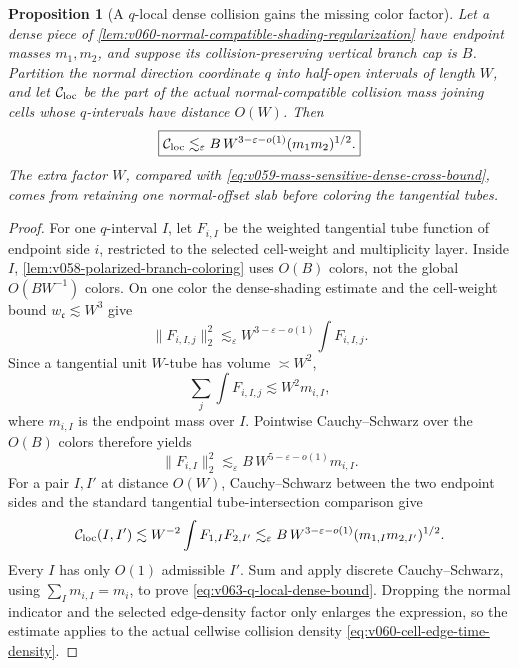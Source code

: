 \documentclass[10pt]{article}
\newtheorem{proposition}[theorem]{Proposition}
\begin{document}
\begin{proposition}[A \(q\)-local dense collision gains the missing color factor]
\label{prop:v063-q-local-dense-bound}
Let a dense piece of
\cref{lem:v060-normal-compatible-shading-regularization} have endpoint masses \(m_1,m_2\), and
suppose its collision-preserving vertical branch cap is \(B\).  Partition the normal direction
coordinate \(q\) into half-open intervals of length \(W\), and let
\(\mathcal C_{\rm loc}\) be the part of the actual normal-compatible collision mass joining cells
whose \(q\)-intervals have distance \(O(W)\).  Then
\begin{equation}
\label{eq:v063-q-local-dense-bound}
\boxed{
\mathcal C_{\rm loc}
\lesssim_\varepsilon
B\,W^{3-\varepsilon-o(1)}
(m_1m_2)^{1/2}.
}
\end{equation}
The extra factor \(W\), compared with
\eqref{eq:v059-mass-sensitive-dense-cross-bound}, comes from retaining one normal-offset slab before
coloring the tangential tubes.
\end{proposition}

\begin{proof}
For one \(q\)-interval \(I\), let \(F_{i,I}\) be the weighted tangential tube function of endpoint
side \(i\), restricted to the selected cell-weight and multiplicity layer.  Inside \(I\),
\cref{lem:v058-polarized-branch-coloring} uses \(O(B)\) colors, not the global
\(O(BW^{-1})\) colors.  On one color the dense-shading estimate and the cell-weight bound
\(w_{\mathfrak c}\lesssim W^3\) give
\[
\|F_{i,I,j}\|_2^2
\lesssim_\varepsilon
W^{3-\varepsilon-o(1)}
\int F_{i,I,j}.
\]
Since a tangential unit \(W\)-tube has volume \(\asymp W^2\),
\[
\sum_j\int F_{i,I,j}
\lesssim
W^2m_{i,I},
\]
where \(m_{i,I}\) is the endpoint mass over \(I\).  Pointwise Cauchy--Schwarz over the \(O(B)\)
colors therefore yields
\[
\|F_{i,I}\|_2^2
\lesssim_\varepsilon
B\,W^{5-\varepsilon-o(1)}m_{i,I}.
\]
For a pair \(I,I'\) at distance \(O(W)\), Cauchy--Schwarz between the two endpoint sides and the
standard tangential tube-intersection comparison give
\[
\mathcal C_{\rm loc}(I,I')
\lesssim
W^{-2}\int F_{1,I}F_{2,I'}
\lesssim_\varepsilon
B\,W^{3-\varepsilon-o(1)}
(m_{1,I}m_{2,I'})^{1/2}.
\]
Every \(I\) has only \(O(1)\) admissible \(I'\).  Sum and apply discrete Cauchy--Schwarz, using
\(\sum_I m_{i,I}=m_i\), to prove
\eqref{eq:v063-q-local-dense-bound}.  Dropping the normal indicator and the selected edge-density
factor only enlarges the expression, so the estimate applies to the actual cellwise collision
density \eqref{eq:v060-cell-edge-time-density}.
\end{proof}
\end{document}
